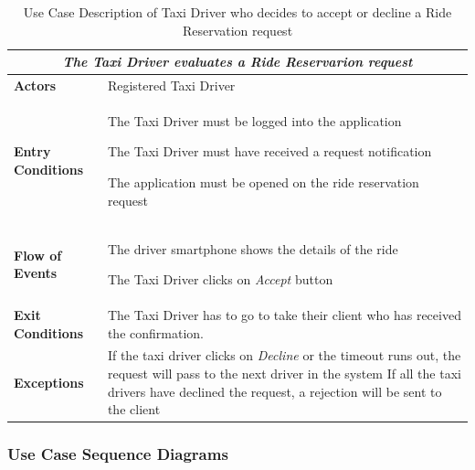 \documentclass[a4paper]{article}
\begin{document}
\begin{table} [H]
\begin{center}
\begin{tabular}{ |m{}|m{}|  }
\hline
    \multicolumn{2}{|c|}{\textbf{\textit{The Taxi Driver evaluates a Ride Reservarion request}}} \\
\hline \hline
    \textbf{Actors}
&   Registered Taxi Driver
\\ \hline
    \textbf{Entry Conditions}
&   
    \begin{itemize*}
    \item The Taxi Driver must be logged into the application
    \item The Taxi Driver must have received a request notification
    \item The application must be opened on the ride reservation request
    \end{itemize*}
\\ \hline
    \textbf{Flow of Events}
& 
    \begin{enumerate*}
    \item The driver smartphone shows the details of the ride
    \item The Taxi Driver clicks on \emph{Accept} button
    \end{enumerate*}
\\ \hline
    \textbf{Exit Conditions}
&  The Taxi Driver has to go to take their client who has received the confirmation.
\\ \hline
    \textbf{Exceptions}
&   If the taxi driver clicks on \emph{Decline} or the timeout runs out, the request will pass to the next driver in the system \newline
If all the taxi drivers have declined the request, a rejection will be sent to the client
\\ \hline
\end{tabular}
\end{center}
\caption{Use Case Description of Taxi Driver who decides to accept or decline a Ride Reservation request}
\label{table:taxievaluaterequest}
\end{table}

\subsubsection{Use Case Sequence Diagrams}

\newlength{\sequenceWidth}
\setlength{\sequenceWidth}{\textwidth}
\end{document}
